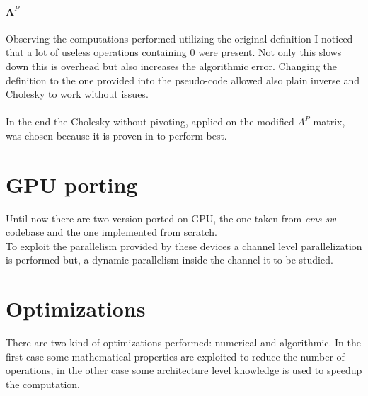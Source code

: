\paragraph{$\boldsymbol A^P$} Observing the computations performed utilizing the original definition I noticed that a lot of useless operations containing $0$ were present. Not only this slows down this is overhead but also increases the algorithmic error. Changing the definition to the one provided into the pseudo-code allowed also plain inverse and Cholesky to work without issues.
\paragraph*{}
In the end the Cholesky without pivoting, applied on the modified $A^P$ matrix, was chosen because it is proven in \cite{Lee_numericallyefficient} to perform best.\\

\section{GPU porting}
Until now there are two version ported on GPU, the one taken from \textit{cms-sw} codebase and the one implemented from scratch.\\
To exploit the parallelism provided by these devices a channel level parallelization is performed but, a dynamic parallelism inside the channel it to be studied.%

\section{Optimizations}
There are two kind of optimizations performed: numerical and algorithmic. In the first case some mathematical properties are exploited to reduce the number of operations, in the other case some architecture level knowledge is used to speedup the computation.
